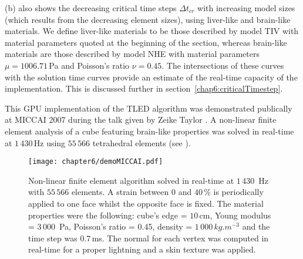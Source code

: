 (b) also shows the decreasing critical time steps $ \Delta t_{cr} $ with increasing model sizes (which results from the decreasing element sizes), using liver-like and brain-like materials. We define liver-like materials to be those described by model TIV with material parameters quoted at the beginning of the section, whereas brain-like materials are those described by model NHE with material parameters $\mu = 1006.71\, $Pa and Poisson's ratio $\nu = 0.45$. The intersections of these curves with the solution time curves provide an estimate of the real-time capacity of the implementation. This is discussed further in section~\ref{chap6:criticalTimestep}. 

\bigskip

\ON
This GPU implementation of the TLED algorithm was demonstrated publically at MICCAI 2007 during the talk given by Zeike Taylor \citep{Taylor07b}. A non-linear finite element analysis of a cube featuring brain-like properties was solved in real-time at $1\,430\,$Hz using $55\,566$ tetrahedral elements (see ).
%
\begin{figure}[ht]
\begin{center}
\texttt{[image: chapter6/demoMICCAI.pdf]}
\end{center}
\caption[Real-time demo at MICCAI 2007]{Non-linear finite element algorithm solved in real-time at $1\,430\,$ Hz with $55\,566$ elements. A strain between 0 and $40\, \%$ is periodically applied to one face whilst the opposite face is fixed. The material properties were the following: cube's edge = $10\,$cm, Young modulus = $3\,000\,$ Pa, Poisson's ratio = 0.45, density = $1\,000\, kg.m^{-3}$ and the time step was $0.7\,$ms. The normal for each vertex was computed in real-time for a proper lightning and a skin texture was applied.} 
\label{chap6:fig-demoMICCAI}
\end{figure}
\OFF

